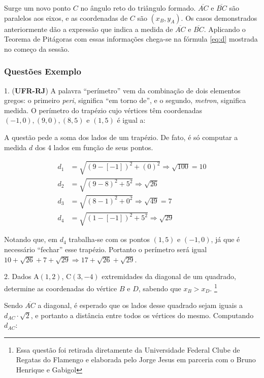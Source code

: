 \documentclass[11pt]{memoir}
\begin{document}
Surge um novo ponto $C$ no ângulo reto do triângulo formado. $\overline{AC}$ e $\overline{BC}$ são paralelos aos eixos, e as coordenadas de $C$ são $(x_{B}, y_{A})$. Os casos demonstrados anteriormente dão a expressão que indica a medida de $\overline{AC}$ e $\overline{BC}$. Aplicando o Teorema de Pitágoras com essas informações chega-se na fórmula \ref{eq:d} mostrada no começo da sessão.

\subsubsection{Questões Exemplo}

\begin{tcolorbox}[colback=LightYellow]
1. (\textbf{UFR-RJ}) A palavra ``perímetro'' vem da combinação de dois elementos gregos: o primeiro \emph{peri}, significa ``em torno de'', e o segundo, \emph{metron}, significa medida. O perímetro do trapézio cujo vértices têm coordenadas $(-1, 0), (9, 0), (8, 5)$ e $(1,5)$ é igual a:
\end{tcolorbox}

A questão pede a soma dos lados de um trapézio. De fato, é só computar a medida $d$ dos 4 lados em função de seus pontos.

\begin{align*}
  d_{1} &= \sqrt{(9 - [-1])^{2} + (0)^{2}} \Rightarrow \sqrt{100} = 10 \\
  d_{2} &= \sqrt{(9 - 8)^{2} + 5^{2}} \Rightarrow \sqrt{26} \\
  d_{3} &= \sqrt{(8 - 1)^{2} + 0^{2}} \Rightarrow \sqrt{49} = 7 \\
  d_{4} &= \sqrt{(1 - [-1])^{2} + 5^{2}} \Rightarrow \sqrt{29}
\end{align*}

Notando que, em $d_{4}$ trabalha-se com os pontos $(1, 5)$ e $(-1, 0)$, já que é necessário ``fechar'' esse trapézio. Portanto o perímetro será igual $10 + \sqrt{26} + 7 + \sqrt{29} \Rightarrow 17 + \sqrt{26} + \sqrt{29}$.

\begin{tcolorbox}[colback=LightYellow]
2. Dados A$(1, 2)$, C$(3, -4)$ extremidades da diagonal de um quadrado, determine as coordenadas do vértice $B$ e $D$, sabendo que $x_{B} > x_{D}$. \footnote{Essa questão foi retirada diretamente da Universidade Federal Clube de Regatas do Flamengo e elaborada pelo Jorge Jesus em parceria com o Bruno Henrique e Gabigol}
\end{tcolorbox}

Sendo $\overline{AC}$ a diagonal, é esperado que os lados desse quadrado sejam iguais a $d_{AC}\cdot \sqrt{2}$, e portanto a distância entre todos os vértices do mesmo. Computando $d_{AC}$:
\end{document}
